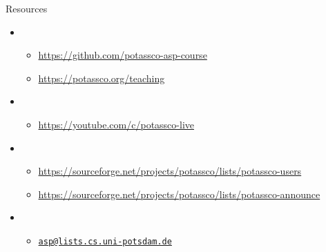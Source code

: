 \begin{frame}{Resources}
  \bigskip
  \begin{itemize}
  \item {}
    \begin{itemize}
    \item \url{https://github.com/potassco-asp-course}
    \item \url{https://potassco.org/teaching}
    \end{itemize}
    \smallskip
  \item {}
    \begin{itemize}
    \item \url{https://youtube.com/c/potassco-live}
    \end{itemize}
    \smallskip
  \item {}
    \begin{itemize}
    \item \scriptsize\url{https://sourceforge.net/projects/potassco/lists/potassco-users}
    \item \scriptsize\url{https://sourceforge.net/projects/potassco/lists/potassco-announce}
    \end{itemize}
    \bigskip
  \item {}
    \begin{itemize}
    \item \href{mailto:asp@lists.cs.uni-potsdam.de}{\texttt{asp@lists.cs.uni-potsdam.de}}
    \end{itemize}
  \end{itemize}
\end{frame}
%

